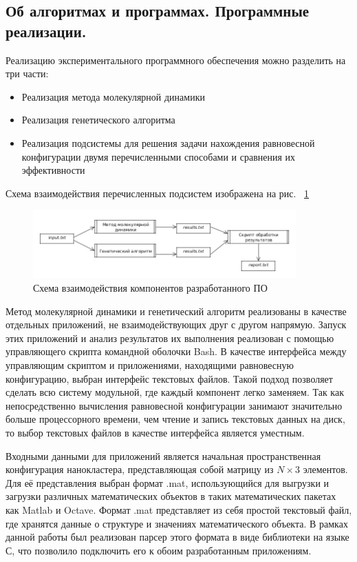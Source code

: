 \subsection{Об алгоритмах и программах. Программные реализации.}
\label{sec:2a}

Реализацию экспериментального программного обеспечения можно разделить
на три части:

\begin{itemize}
\item{Реализация метода молекулярной динамики}
\item{Реализация генетического алгоритма}
\item{Реализация подсистемы для решения задачи нахождения равновесной конфигурации
двумя перечисленными способами и сравнения их эффективности}
\end{itemize}

Схема взаимодействия перечисленных подсистем изображена на рис.~ \ref{system_implementation}

\begin{figure}[ht!]
 \begin{center}
 \includegraphics[width=0.9\textwidth]{FIGs/system_implementation.png}
 \end{center}
 \caption {Схема взаимодействия компонентов разработанного ПО}
 \label{system_implementation} 
\end{figure}

Метод молекулярной динамики и генетический алгоритм реализованы в качестве
отдельных приложений, не взаимодействующих друг с другом напрямую. Запуск этих
приложений и анализ результатов их выполнения реализован с помощью управляющего скрипта
командной оболочки Bash. В качестве интерфейса между управляющим скриптом и
приложениями, находящими равновесную конфигурацию, выбран интерфейс текстовых файлов.
Такой подход позволяет сделать всю систему модульной, где каждый компонент легко
заменяем. Так как непосредственно вычисления равновесной конфигурации занимают значительно
больше процессорного времени, чем чтение и запись текстовых данных на диск, то
выбор текстовых файлов в качестве интерфейса является уместным.

Входными данными для приложений является начальная пространственная конфигурация нанокластера,
представляющая собой матрицу из $N \times 3$ элементов. Для её представления выбран формат
.mat, использующийся для выгрузки и загрузки различных математических объектов в таких
математических пакетах как Matlab и Octave. Формат .mat представляет из себя простой текстовый
файл, где хранятся данные о структуре и значениях математического объекта. В рамках данной работы
был реализован парсер этого формата в виде библиотеки на языке С, что позволило подключить
его к обоим разработанным приложениям.

